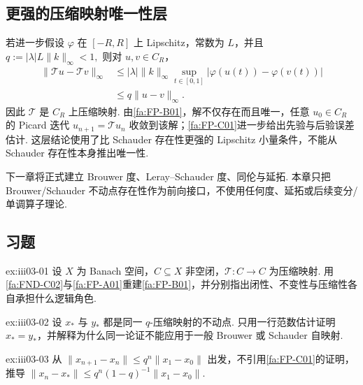 \subsection{更强的压缩映射唯一性层}

若进一步假设 \(\displaystyle \varphi\) 在 \(\displaystyle[-R,R]\) 上 Lipschitz，常数为 \(\displaystyle L\)，并且
\(\displaystyle q:=|\lambda|L\|k\|_\infty<1,\)
则对 \(\displaystyle u,v\in C_R\)，
\[
\begin{aligned}
\|\mathcal T u-\mathcal T v\|_\infty
&\leqslant
|\lambda|\|k\|_\infty
\sup_{t\in[0,1]}|\varphi(u(t))-\varphi(v(t))|\\
&\leqslant
q\|u-v\|_\infty.
\end{aligned}
\]
因此 \(\displaystyle \mathcal T\) 是 \(\displaystyle C_R\) 上压缩映射. 由\autoref{fa:FP-B01}，解不仅存在而且唯一，任意 \(\displaystyle u_0\in C_R\) 的 Picard 迭代 \(\displaystyle u_{n+1}=\mathcal T u_n\) 收敛到该解；\autoref{fa:FP-C01}进一步给出先验与后验误差估计. 这层结论使用了比 Schauder 存在性更强的 Lipschitz 小量条件，不能从 Schauder 存在性本身推出唯一性.

\begin{FARemark}
下一章将正式建立 Brouwer 度、Leray--Schauder 度、同伦与延拓. 本章只把 Brouwer/Schauder 不动点存在性作为前向接口，不使用任何度、延拓或后续变分/单调算子理论.
\end{FARemark}

\subsection{习题}

\begin{FAExercise}{ex:iii03-01}
设 \(\displaystyle X\) 为 Banach 空间，\(\displaystyle C\subseteq X\) 非空闭，\(\displaystyle \mathcal T:C\to C\) 为压缩映射. 用\autoref{fa:FND-C02}与\autoref{fa:FP-A01}重建\autoref{fa:FP-B01}，并分别指出闭性、不变性与压缩性各自承担什么逻辑角色.
\end{FAExercise}

\begin{FAExercise}{ex:iii03-02}
设 \(\displaystyle x_*\) 与 \(\displaystyle y_*\) 都是同一 \(\displaystyle q\)-压缩映射的不动点. 只用一行范数估计证明 \(\displaystyle x_*=y_*\)，并解释为什么同一论证不能应用于一般 Brouwer 或 Schauder 自映射.
\end{FAExercise}

\begin{FAExercise}{ex:iii03-03}
从 \(\displaystyle \|x_{n+1}-x_n\|\leqslant q^n\|x_1-x_0\|\) 出发，不引用\autoref{fa:FP-C01}的证明，推导 \(\displaystyle \|x_n-x_*\|\leqslant q^n(1-q)^{-1}\|x_1-x_0\|\).
\end{FAExercise}

